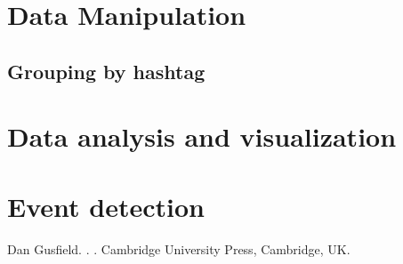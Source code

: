 \documentclass[11pt]{article}
\begin{document}
\section{Data Manipulation}

\subsection{Grouping by hashtag}

\section{Data analysis and visualization}

\section{Event detection}


\begin{thebibliography}{}

Dan Gusfield.
.
.
\newblock Cambridge University Press, Cambridge, UK.

\end{thebibliography}
\end{document}
